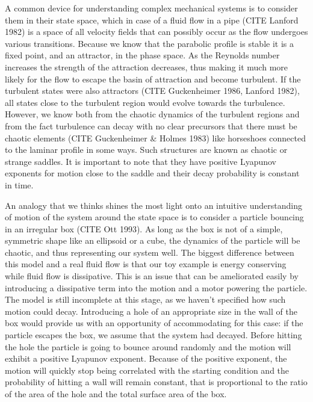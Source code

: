 \documentclass[11pt,a4paper]{article}
\begin{document}
A common device for understanding complex mechanical systems is to consider them in their state space, which in case of a fluid flow in a pipe (CITE Lanford 1982) is a space of all velocity fields that can possibly occur as the flow undergoes various transitions.
Because we know that the parabolic profile is stable it is a fixed point, and an attractor, in the phase space.
As the Reynolds number increases the strength of the attraction decreases, thus making it much more likely for the flow to escape the basin of attraction and become turbulent.
If the turbulent states were also attractors (CITE Guckenheimer 1986, Lanford 1982), all states close to the turbulent region would evolve towards the turbulence.
However, we know both from the chaotic dynamics of the turbulent regions and from the fact turbulence can decay with no clear precursors that there must be chaotic elements (CITE Guckenheimer \& Holmes 1983) like horseshoes connected to the laminar profile in some ways.
Such structures are known as chaotic or strange saddles.
It is important to note that they have positive Lyapunov exponents for motion close to the saddle and their decay probability is constant in time.

An analogy that we thinks shines the most light onto an intuitive understanding of motion of the system around the state space is to consider a particle bouncing in an irregular box (CITE Ott 1993).
As long as the box is not of a simple, symmetric shape like an ellipsoid or a cube, the dynamics of the particle will be chaotic, and thus representing our system well.
The biggest difference between this model and a real fluid flow is that our toy example is energy conserving while fluid flow is dissipative.
This is an issue that can be ameliorated easily by introducing a dissipative term into the motion and a motor powering the particle.
The model is still incomplete at this stage, as we haven't specified how such motion could decay.
Introducing a hole of an appropriate size in the wall of the box would provide us with an opportunity of accommodating for this case: if the particle escapes the box, we assume that the system had decayed.
Before hitting the hole the particle is going to bounce around randomly and the motion will exhibit a positive Lyapunov exponent.
Because of the positive exponent, the motion will quickly stop being correlated with the starting condition and the probability of hitting a wall will remain constant, that is proportional to the ratio of the area of the hole and the total surface area of the box.
\end{document}
